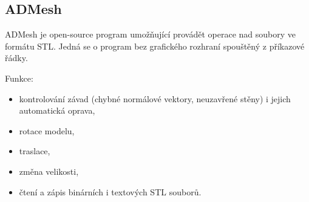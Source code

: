 \subsection{ADMesh}
ADMesh \autocite{ADMesh} je open-source program umožňující provádět operace nad soubory ve formátu \gls{STL}. Jedná se o program bez grafického rozhraní spouštěný z příkazové řádky. 

Funkce:
\begin{itemize}
    \item kontrolování závad (chybné normálové vektory, neuzavřené stěny) i jejich automatická oprava,
    \item rotace modelu,
    \item traslace,
    \item změna velikosti,
    \item čtení a zápis binárních i textových \gls{STL} souborů.
\end{itemize}